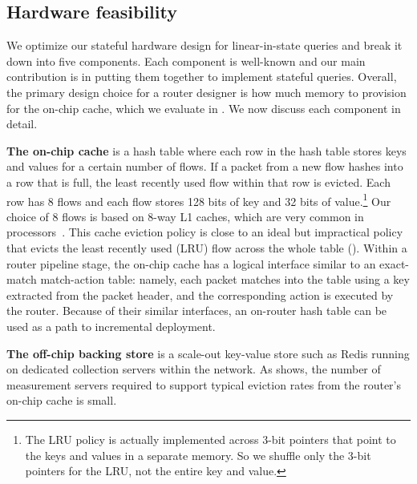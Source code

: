 
\subsection{Hardware feasibility}
\label{sec:hardware-feasibility}
We optimize our stateful hardware design for linear-in-state queries and break
it down into five components.  Each component is well-known and our main
contribution is in putting them together to implement stateful queries.
Overall, the primary design choice for a router designer is how much memory to
provision for the on-chip cache, which we evaluate in . We now
discuss each component in detail.

\textbf{The on-chip cache} is a hash table where each row in the hash table
stores keys and values for a certain number of flows. If a packet from a new
flow hashes into a row that is full, the least recently used flow within that row is
evicted. Each row has 8 flows and each flow stores 128 bits of key and 32 bits
of value.\footnote{The LRU policy is actually implemented across 3-bit pointers
that point to the keys and values in a separate memory. So we 
shuffle only the 3-bit pointers for the LRU, not the entire key and
value.} Our choice of 8 flows is based on 8-way L1 caches, which are very
common in processors~\cite{intel_opt_manual}. This cache eviction policy is
close to an ideal but impractical policy that evicts the least recently used
(LRU) flow across the whole table ().
%
Within a router pipeline stage, the on-chip cache has a logical interface
similar to an exact-match match-action table: namely, each packet matches into
the table using a key extracted from the packet header, and the corresponding
action is executed by the router.
%
%
Because of their similar interfaces, an on-router hash table can be used as
a path to
incremental deployment.

\textbf{The off-chip backing store} is a scale-out key-value store such as
Redis running on dedicated collection servers within the network. As
 shows, the number of measurement servers required to support
typical eviction rates from the router's on-chip cache is small.%

